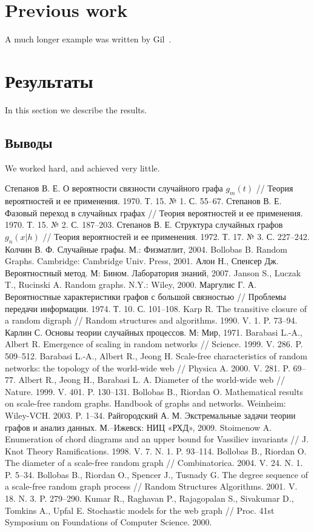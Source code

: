 \documentclass[14pt]{extreport}
\begin{document}
\chapter{Previous work}
A much longer \LaTeXe{} example was written by Gil~\cite{Gil:02}.

\chapter{Результаты}
In this section we describe the results.

\section{Выводы}
We worked hard, and achieved very little.


%
\begin{thebibliography}{9}

\bibitem{}
Степанов В. Е. О вероятности связности случайного графа $g_m(t)$ // Теория вероятностей и ее применения. 1970. Т. 15. № 1. С. 55–67.
\bibitem{}
Степанов В. Е. Фазовый переход в случайных графах // Теория вероятностей и ее применения. 1970. Т. 15. № 2. С. 187–203.
\bibitem{}
Степанов В. Е. Структура случайных графов $g_n(x|h)$ // Теория вероятностей и ее применения. 1972. Т. 17. № 3. С. 227–242.
\bibitem{}
Колчин В. Ф. Случайные графы. М.: Физматлит, 2004.
\bibitem{}
Bollobas B. Random Graphs. Cambridge: Cambridge Univ. Press, 2001.
\bibitem{}
Алон Н., Спенсер Дж. Вероятностный метод. М: Бином. Лаборатория знаний, 2007.
\bibitem{}
Janson S., Luczak T., Rucinski A. Random graphs. N.Y.: Wiley, 2000.
\bibitem{}
Маргулис Г. А. Вероятностные характеристики графов с большой связностью // Проблемы передачи информации. 1974. Т. 10. С. 101–108.
\bibitem{}
Karp R. The transitive closure of a random digraph // Random structures and algorithms. 1990. V. 1. P. 73–94.
\bibitem{}
Карлин С. Основы теории случайных процессов. М: Мир, 1971.
\bibitem{}
Barabasi L.-A., Albert R. Emergence of scaling in random networks // Science. 1999. V. 286. P. 509–512.
\bibitem{}
Barabasi L.-A., Albert R., Jeong H. Scale-free characteristics of random networks: the topology of the world-wide web // Physica A. 2000. V. 281. P. 69–77.
\bibitem{}
Albert R., Jeong H., Barabasi L. A. Diameter of the world-wide web // Nature. 1999. V. 401. P. 130–131.
\bibitem{}
Bollobas B., Riordan O. Mathematical results on scale-free random graphs. Handbook of graphs and networks. Weinheim: Wiley-VCH. 2003. P. 1–34.
\bibitem{}
Райгородский А. М. Экстремальные задачи теории графов и анализ данных. М.–Ижевск: НИЦ «РХД», 2009.
\bibitem{}
Stoimenow A. Enumeration of chord diagrams and an upper bound for Vassiliev invariants // J. Knot Theory Ramifications. 1998. V. 7. N. 1. P. 93–114.
\bibitem{}
Bollobas B., Riordan O. The diameter of a scale-free random graph // Combinatorica. 2004. V. 24. N. 1. P. 5–34.
\bibitem{}
Bollobas B., Riordan O., Spencer J., Tusnady G. The degree sequence of a scale-free random graph process // Random Structures Algorithms. 2001. V. 18. N. 3. P. 279–290.
\bibitem{}
Kumar R., Raghavan P., Rajagopalan S., Sivakumar D., Tomkins A., Upfal E. Stochastic models for the web graph // Proc. 41st Symposium on Foundations of Computer Science. 2000.


\end{thebibliography}
\end{document}

